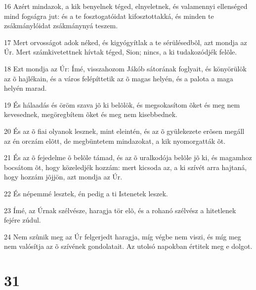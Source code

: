 \par 16 Azért mindazok, a kik benyelnek téged, elnyeletnek, és valamennyi ellenséged mind fogságra jut: és a te fosztogatóidat kifosztottakká, és minden te zsákmánylóidat zsákmánynyá teszem.
\par 17 Mert orvosságot adok néked, és kigyógyítlak a te sérülésedbõl, azt mondja az Úr. Mert számkivetettnek hívtak téged, Sion; nincs, a ki tudakozódjék felõle.
\par 18 Ezt mondja az Úr: Ímé, visszahozom Jákób sátorának foglyait, és könyörülök az õ hajlékain, és a város felépíttetik az õ magas helyén, és a palota a maga helyén marad.
\par 19 És hálaadás és öröm szava jõ ki belõlök, és megsokasítom õket és meg nem kevesednek, megöregbítem õket és meg nem kisebbednek.
\par 20 És az õ fiai olyanok lesznek, mint eleintén, és az õ gyülekezete erõsen megáll az én orczám elõtt, de megbüntetem mindazokat, a kik nyomorgatták õt.
\par 21 És az õ fejedelme õ belõle támad, és az õ uralkodója belõle jõ ki, és magamhoz bocsátom õt, hogy közeledjék hozzám: mert kicsoda az, a ki szívét arra hajtaná, hogy hozzám jõjjön, azt mondja az Úr.
\par 22 És népemmé lesztek, én pedig a ti Istenetek leszek.
\par 23 Ímé, az Úrnak szélvésze, haragja tör elõ, és a rohanó szélvész a hitetlenek fejére zúdul.
\par 24 Nem szûnik meg az Úr felgerjedt haragja, míg végbe nem viszi, és míg meg nem valósítja az õ szívének gondolatait. Az utolsó napokban értitek meg e dolgot.

\chapter{31}

